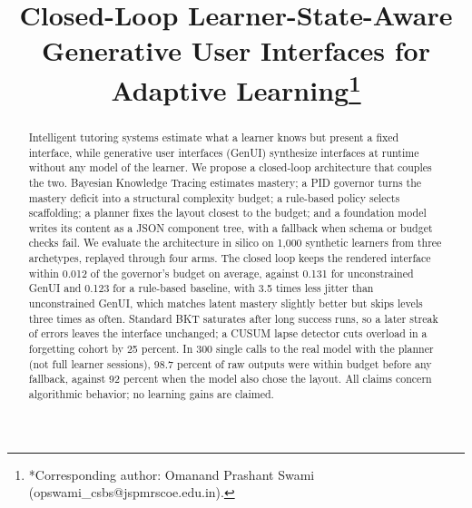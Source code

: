 \documentclass[conference]{IEEEtran}
\begin{document}
\title{Closed-Loop Learner-State-Aware Generative User Interfaces for Adaptive Learning\thanks{*Corresponding author: Omanand Prashant Swami (opswami\_csbs@jspmrscoe.edu.in).}}

\author{
}

\maketitle

\begin{abstract}
Intelligent tutoring systems estimate what a learner knows but present a
fixed interface, while generative user interfaces (GenUI) synthesize
interfaces at runtime without any model of the learner. We propose a
closed-loop architecture that couples the two. Bayesian Knowledge Tracing
estimates mastery; a PID governor turns the mastery deficit into a structural
complexity budget; a rule-based policy selects scaffolding; a planner fixes the
layout closest to the budget; and a foundation model writes its content as a
JSON component tree, with a fallback when schema or budget checks fail. We evaluate the architecture in silico on
1,000 synthetic learners from three archetypes, replayed through four arms.
The closed loop keeps the rendered interface within 0.012 of the governor's
budget on average, against 0.131 for unconstrained GenUI and 0.123 for a
rule-based baseline, with 3.5 times less jitter than unconstrained GenUI,
which matches latent mastery slightly better but skips levels three times as
often. Standard BKT saturates after long success runs, so a later streak of
errors leaves the interface unchanged; a CUSUM lapse detector cuts overload
in a forgetting cohort by 25 percent. In 300 single calls to the real model with the
planner (not full learner sessions), 98.7 percent of raw outputs were within budget before any fallback, against 92 percent when the model
also chose the layout. All claims concern algorithmic behavior;
no learning gains are claimed.
\end{abstract}
\end{document}
